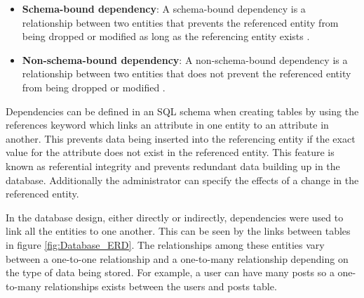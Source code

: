\begin{itemize}
	\item \textbf{Schema-bound dependency}: A schema-bound dependency is a relationship between two entities that prevents the referenced entity from being dropped or modified as long as the referencing entity exists \cite{Microsoft:Dependencies}.
	\item \textbf{Non-schema-bound dependency}: A non-schema-bound dependency is a relationship between two entities that does not prevent the referenced entity from being dropped or modified \cite{Microsoft:Dependencies}.
\end{itemize}

Dependencies can be defined in an SQL schema when creating tables by using the references keyword which links an attribute in one entity to an attribute in another. This prevents data being inserted into the referencing entity if the exact value for the attribute does not exist in the referenced entity. This feature is known as referential integrity and prevents redundant data building up in the database. Additionally the administrator can specify the effects of a change in the referenced entity.

In the database design, either directly or indirectly, dependencies were used to link all the entities to one another. This can be seen by the links between tables in figure \ref{fig:Database_ERD}. The relationships among these entities vary between a one-to-one relationship and a one-to-many relationship depending on the type of data being stored. For example, a user can have many posts so a one-to-many relationships exists between the users and posts table.
